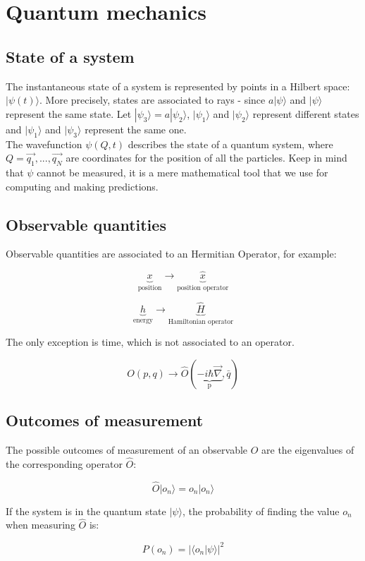 \chapter{Quantum mechanics}

\section{State of a system}
The instantaneous state of a system is represented by points in a Hilbert space: $|\psi(t)\rangle$.
More precisely,  states are associated to rays - since $a|\psi\rangle$ and $|\psi\rangle$ represent the same state.
Let $|\psi_3\rangle = a |\psi_2\rangle$, $|\psi_1\rangle$ and $|\psi_2\rangle$ represent different states and $|\psi_1\rangle$ and $|\psi_3\rangle$ represent the same one.\\
\noindent
The wavefunction $\psi(Q,t)$ describes the state of a quantum system, where $Q=\vec{q_1},...,\vec{q_N}$ are coordinates for the position of all the particles. Keep in mind that $\psi$ cannot be measured, it is a mere mathematical tool that we use for computing and making predictions.

\section{Observable quantities}
Observable quantities are associated to an Hermitian Operator, for example:

$$\underbrace{x}_{\text{position}}\rightarrow\underbrace{\hat{x}}_{\text{position operator}}$$

$$\underbrace{h}_{\text{energy}}\rightarrow\underbrace{\hat{H}}_{\text{Hamiltonian operator}}$$

The only exception is time, which is not associated to an operator.

$$O(p,q)\rightarrow\hat{O}(\underbrace{-i\hbar\vec{\nabla}}_{\text{p}},\bar{q})$$

\section{Outcomes of measurement}
The possible outcomes of measurement of an observable $O$ are the eigenvalues of the corresponding operator $\hat{O}$:

$$\hat{O}|o_n\rangle = o_n|o_n\rangle$$

If the system is in the quantum state $|\psi\rangle$, the probability of finding the value $o_n$ when measuring $\hat{O}$ is:

$$P(o_n) = |\langle o_n|\psi\rangle|^2$$

